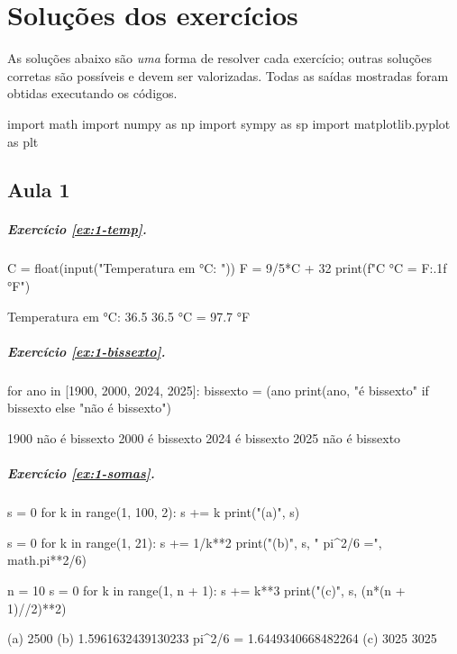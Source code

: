 \chapter{Soluções dos exercícios}
\label{ap:solucoes}

As soluções abaixo são \emph{uma} forma de resolver cada exercício; outras soluções corretas são possíveis e
devem ser valorizadas. Todas as saídas mostradas foram obtidas executando os códigos.

\begin{entrada}
import math
import numpy as np
import sympy as sp
import matplotlib.pyplot as plt
\end{entrada}

\section*{Aula 1}

\paragraph{Exercício \ref{ex:1-temp}.}
\begin{entrada}
C = float(input("Temperatura em °C: "))
F = 9/5*C + 32
print(f"{C} °C = {F:.1f} °F")
\end{entrada}
\begin{saida}
Temperatura em °C: 36.5
36.5 °C = 97.7 °F
\end{saida}

\paragraph{Exercício \ref{ex:1-bissexto}.}
\begin{entrada}
for ano in [1900, 2000, 2024, 2025]:
    bissexto = (ano %
    print(ano, "é bissexto" if bissexto else "não é bissexto")
\end{entrada}
\begin{saida}
1900 não é bissexto
2000 é bissexto
2024 é bissexto
2025 não é bissexto
\end{saida}

\paragraph{Exercício \ref{ex:1-somas}.}
\begin{entrada}
s = 0
for k in range(1, 100, 2):
    s += k
print("(a)", s)

s = 0
for k in range(1, 21):
    s += 1/k**2
print("(b)", s, "  pi^2/6 =", math.pi**2/6)

n = 10
s = 0
for k in range(1, n + 1):
    s += k**3
print("(c)", s, (n*(n + 1)//2)**2)
\end{entrada}
\begin{saida}
(a) 2500
(b) 1.5961632439130233   pi^2/6 = 1.6449340668482264
(c) 3025 3025
\end{saida}


